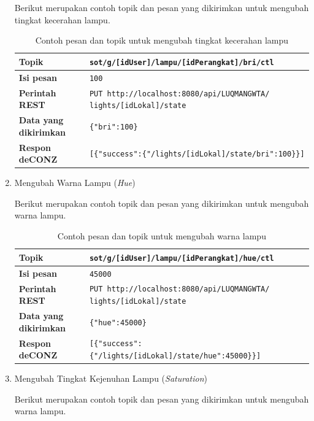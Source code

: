 \begin{enumerate}
	Berikut merupakan contoh topik dan pesan yang dikirimkan untuk mengubah tingkat kecerahan lampu.
	
	\begin{table}
		\centering
		\caption{Contoh pesan dan topik untuk mengubah tingkat kecerahan lampu}
		\label{tab:brightnessLampu}
		\begin{tabular}{| l | p{11cm} |}
			\hline
			\textbf{Topik} & \texttt{sot/g/[idUser]/lampu/[idPerangkat]/bri/ctl} \\
			\hline
			\textbf{Isi pesan} & \texttt{100} \\
			\hline
			\textbf{Perintah REST} & \texttt{PUT http://localhost:8080/api/LUQMANGWTA/ lights/[idLokal]/state} \\
			\hline
			\textbf{Data yang dikirimkan} & \texttt{\{"bri":100\}} \\
			\hline
			\textbf{Respon deCONZ} & \texttt{[\{"success":\{"/lights/[idLokal]/state/bri":100\}\}]} \\
			\hline
		\end{tabular}
	\end{table}
	
	\item Mengubah Warna Lampu (\textit{Hue})
	
	Berikut merupakan contoh topik dan pesan yang dikirimkan untuk mengubah warna lampu.
	
	\begin{table}
		\centering
		\caption{Contoh pesan dan topik untuk mengubah warna lampu}
		\label{tab:hueLampu}
		\begin{tabular}{| l | p{11cm} |}
			\hline
			\textbf{Topik} & \texttt{sot/g/[idUser]/lampu/[idPerangkat]/hue/ctl} \\
			\hline
			\textbf{Isi pesan} & \texttt{45000} \\
			\hline
			\textbf{Perintah REST} & \texttt{PUT http://localhost:8080/api/LUQMANGWTA/ lights/[idLokal]/state} \\
			\hline
			\textbf{Data yang dikirimkan} & \texttt{\{"hue":45000\}} \\
			\hline
			\textbf{Respon deCONZ} & \texttt{[\{"success":\{"/lights/[idLokal]/state/hue":45000\}\}]} \\
			\hline
		\end{tabular}
	\end{table}
	
	\item Mengubah Tingkat Kejenuhan Lampu (\textit{Saturation})
	
	Berikut merupakan contoh topik dan pesan yang dikirimkan untuk mengubah warna lampu.
	

\end{enumerate}
